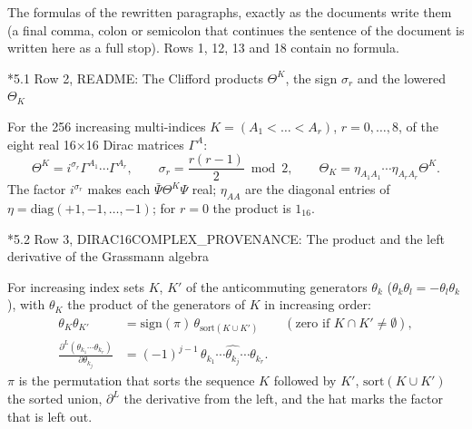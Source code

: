 \documentclass[10pt,a4paper]{article}
\makeatletter
\renewcommand\subsection{\@startsection{subsection}{2}{\z@}{-3.25ex\@plus -1ex \@minus -.2ex}{1.5ex \@plus .2ex}{\normalfont\large\bfseries\raggedright}}
\makeatother
\begin{document}
The formulas of the rewritten paragraphs, exactly as the documents write them (a final comma, colon or semicolon that continues the sentence of the document is written here as a full stop). Rows 1, 12, 13 and 18 contain no formula.

\subsection*{5.1 Row 2, README: The Clifford products \texorpdfstring{$\Theta^K$}{K}, the sign \texorpdfstring{$\sigma_r$}{σr} and the lowered \texorpdfstring{$\Theta_K$}{K}}
For the 256 increasing multi-indices $K=(A_1<\dots<A_r)$, $r=0,\dots,8$, of the eight real 16×16 Dirac matrices $\Gamma^A$:
\begin{equation*}
\Theta^K=i^{\sigma_r}\Gamma^{A_1}\cdots\Gamma^{A_r},\qquad \sigma_r=\frac{r(r-1)}2\bmod2,\qquad \Theta_K=\eta_{A_1A_1}\cdots\eta_{A_rA_r}\Theta^K .
\end{equation*}
The factor $i^{\sigma_r}$ makes each $\bar\Psi\Theta^K\Psi$ real; $\eta_{AA}$ are the diagonal entries of $\eta=\mathrm{diag}(+1,-1,\dots,-1)$; for $r=0$ the product is $1_{16}$.

\subsection*{5.2 Row 3, DIRAC16COMPLEX\_PROVENANCE: The product and the left derivative of the Grassmann algebra}
For increasing index sets $K$, $K'$ of the anticommuting generators $\theta_k$ ($\theta_k\theta_l=-\theta_l\theta_k$), with $\theta_K$ the product of the generators of $K$ in increasing order:
\begin{align*}
\theta_K\theta_{K'}&=\mathrm{sign}(\pi)\,\theta_{\mathrm{sort}(K\cup K')}\qquad(\text{zero if }K\cap K'\neq\emptyset), \\
\frac{\partial^L(\theta_{k_1}\cdots\theta_{k_r})}{\partial\theta_{k_j}}&=(-1)^{j-1}\,\theta_{k_1}\cdots\widehat{\theta_{k_j}}\cdots\theta_{k_r} .
\end{align*}
$\pi$ is the permutation that sorts the sequence $K$ followed by $K'$, $\mathrm{sort}(K\cup K')$ the sorted union, $\partial^L$ the derivative from the left, and the hat marks the factor that is left out.
\end{document}
